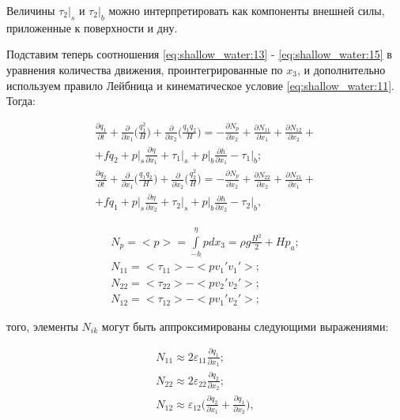 \documentclass[14pt]{extreport}
\begin{document}
Величины $\tau_2|_s$ и $\tau_2|_b$ можно интерпретировать как компоненты внешней силы, приложенные к поверхности и дну.

Подставим теперь соотношения \ref{eq:shallow_water:13} - \ref{eq:shallow_water:15} в уравнения количества движения, проинтегрированные по $x_3$, и дополнительно используем правило Лейбница\cite{bib:calc:zorich} и кинематическое условие \ref{eq:shallow_water:11}. Тогда:

\begin{equation}\label{eq:shallow_water:17}
\begin{aligned}
\frac{\partial q_1}{\partial t} + \frac{\partial}{\partial x_1} \bigg(\frac{q_1^2}{H}\bigg)+\frac{\partial }{\partial x_2}\bigg(\frac{q_1 q_2}{H}\bigg) = -\frac{\partial N_p}{\partial x_2} + \frac{\partial N_{11}}{\partial x_1} + \frac{\partial N_{12}}{\partial x_2} +\\+ fq_2 + p\bigg|_s \frac{\partial \eta}{\partial x_1} + \tau_1\bigg|_s+p\bigg|_b\frac{\partial h}{\partial x_1} - \tau_1\bigg|_b; \\
\frac{\partial q_2}{\partial t} + \frac{\partial}{\partial x_1} \bigg(\frac{q_1 q_2}{H}\bigg)+\frac{\partial }{\partial x_2}\bigg(\frac{q_2^2}{H}\bigg) = -\frac{\partial N_p}{\partial x_2} + \frac{\partial N_{22}}{\partial x_2} + \frac{\partial N_{21}}{\partial x_1} +\\+ fq_1 + p\bigg|_s \frac{\partial \eta}{\partial x_2} + \tau_2\bigg|_s+p\bigg|_b\frac{\partial h}{\partial x_2} - \tau_2\bigg|_b,
\end{aligned}
\end{equation}


\begin{equation}\label{eq:shallow_water:18}
\begin{aligned}
N_p = <p> = \int\limits^\eta_{-h} pdx_3=\rho g \frac{H^2}{2} + Hp_a; \\
N_{11} = <\tau_{11}>-<pv_1'v_1'>; \\
N_{22} = <\tau_{22}>-<pv_2'v_2'>; \\
N_{12} = <\tau_{12}>-<pv_1'v_2'>;
\end{aligned}
\end{equation}

 того, элементы $N_{ik}$ могут быть аппроксимированы следующими выражениями:

\begin{equation}\label{eq:shallow_water:19}
\begin{aligned}
N_{11} \approx 2 \varepsilon_{11}\frac{\partial q_1}{\partial x_1}; \\
N_{22} \approx 2 \varepsilon_{22}\frac{\partial q_2}{\partial x_2}; \\
N_{12} \approx \varepsilon_{12}\bigg(\frac{\partial q_2}{\partial x_1}+\frac{\partial q_1}{\partial x_2}\bigg),
\end{aligned}
\end{equation}
\end{document}
